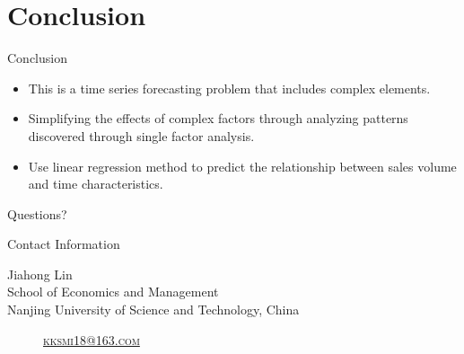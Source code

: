 \documentclass[
 size=14pt,
 paper=smartboard,  %
 mode=present, 		%
 display=slides, 	%
 style=tuliplab,  	%
 pauseslide,
 fleqn,leqno]{powerdot}
\begin{document}
\section{Conclusion}

\begin{slide}[toc=,bm=]{Conclusion}
\begin{itemize}
\item
\smallskip
This is a time series forecasting problem that includes complex elements.

\item
\smallskip
Simplifying the effects of complex factors through analyzing patterns discovered through single factor analysis.

\item
\smallskip
Use linear regression method to predict the relationship between sales volume and time characteristics.

\end{itemize}


\end{slide}


%
\begin{slide}[toc=,bm=]{Questions?}
\begin{center}
\begin{figure}
\end{figure}
\end{center}
\end{slide}


\begin{wideslide}[toc=,bm=]{Contact Information}
\centering
{}
\twocolumn[
lcolwidth=0.35\linewidth,
rcolwidth=0.65\linewidth
]
{
}
{
Jiahong Lin\\
School of Economics and Management\\
Nanjing University of Science and Technology, China
\begin{description}
 \item[\textcolor{orange}{\faEnvelope}] \href{mailto:kksmi18@163.com}
 {\textsc{\footnotesize{kksmi18@163.com}}}


\end{description}
}
\end{wideslide}
\end{document}
